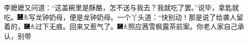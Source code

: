李嬷嬷又问道：“这盖碗里是酥酪，怎不送与我去？我就吃了罢。”说毕，拿匙就吃。{\includegraphics[width=3mm]{../Images/00003}\includegraphics[width=3mm]{../Images/00012}\footnotesize \kaishu 写龙钟奶母，便是龙钟奶母。}一个丫头道：“快别动！那是说了给袭人留着的，{\includegraphics[width=3mm]{../Images/00003}\includegraphics[width=3mm]{../Images/00012}\footnotesize \kaishu 过下无痕。}回来又惹气了。{\includegraphics[width=3mm]{../Images/00003}\includegraphics[width=3mm]{../Images/00012}\footnotesize \kaishu 照应茜雪枫露茶前案。}你老人家自己承认，别带